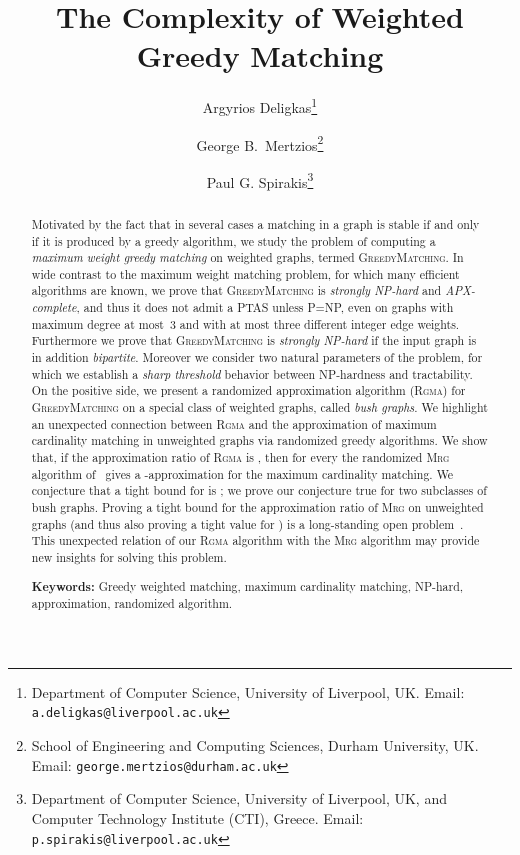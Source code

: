 \documentclass[a4paper,11pt]{article}
\newcommand{\greedy}{\textsc{GreedyMatching}\xspace}
\newcommand{\rgma}{\textsc{Rgma}\xspace}
\begin{document}
\title{\vspace{-0.5cm}The Complexity of Weighted Greedy Matching}

\author{Argyrios Deligkas\thanks{Department of Computer Science, University of Liverpool, UK. Email: \texttt{a.deligkas@liverpool.ac.uk}} 
\and George B.~Mertzios\thanks{School of Engineering and Computing Sciences, Durham University, UK. Email: \texttt{george.mertzios@durham.ac.uk}} 
\and Paul G. Spirakis\thanks{Department of Computer Science, University of Liverpool, UK, and Computer Technology Institute (CTI), Greece. Email: \texttt{p.spirakis@liverpool.ac.uk}}}
\date{\vspace{-1.0cm}}

\maketitle



\begin{abstract}
Motivated by the fact that in several cases a matching in a graph is stable if 
and only if it is produced by a greedy algorithm, we study the problem of 
computing a \emph{maximum weight greedy matching} on weighted graphs, termed \greedy. 
In wide contrast to the maximum weight matching problem, for which many efficient
algorithms are known, we prove that \textsc{GreedyMatching} is \emph{strongly NP-hard} and \emph{APX-complete}, and thus it does not admit a PTAS unless P=NP, 
even on graphs with maximum degree at most~3 and with at most three different integer edge weights. 
Furthermore we prove that \greedy is \emph{strongly NP-hard} if the input graph is in addition \emph{bipartite}.
Moreover we consider two natural parameters of the problem, for which we establish a \emph{sharp threshold} behavior between NP-hardness and tractability. 
On the positive side, we present a randomized approximation algorithm (\rgma) for \greedy on a special class of weighted graphs, called \emph{bush graphs}. 
We highlight an unexpected connection between \rgma and the approximation of 
maximum cardinality matching in unweighted graphs via randomized greedy algorithms.
We show that, if the approximation ratio of \textsc{Rgma} is , 
then for every  the randomized \textsc{Mrg} algorithm of~\cite{ADFS95} gives a -approximation for the maximum cardinality matching. 
We conjecture that a tight bound for  is ; we prove our conjecture true for two subclasses of bush graphs. 
Proving a tight bound for the approximation ratio of \textsc{Mrg} on unweighted graphs (and thus also proving a tight value for ) is a
long-standing open problem~\cite{PS12}. This unexpected relation
of our \textsc{Rgma} algorithm with the \textsc{Mrg} algorithm may provide
new insights for solving this problem.\newline


\noindent \textbf{Keywords:} Greedy weighted matching, maximum cardinality matching, NP-hard, approximation, randomized algorithm.
\end{abstract}
\end{document}
